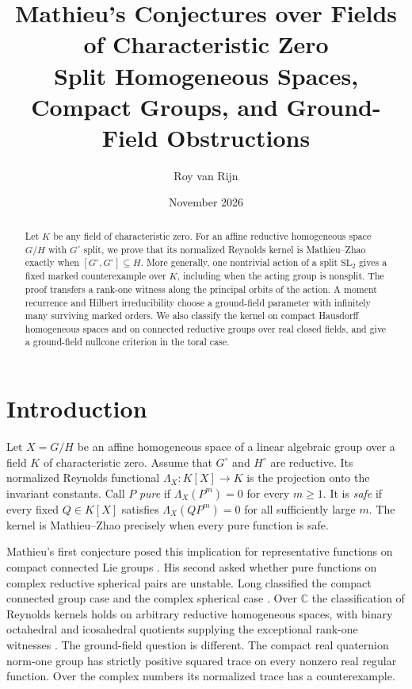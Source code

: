 \documentclass[11pt]{article}
\title{Mathieu's Conjectures over Fields of Characteristic Zero\\
\large Split Homogeneous Spaces, Compact Groups, and Ground-Field Obstructions}
\author{Roy van Rijn}
\date{November 2026}
\newcommand{\CC}{\mathbb C}
\newcommand{\SL}{\mathrm{SL}}
\begin{document}
\maketitle

\begin{abstract}
Let \(K\) be any field of characteristic zero. For an affine reductive
homogeneous space \(G/H\) with \(G^\circ\) split, we prove that its normalized
Reynolds kernel is Mathieu--Zhao exactly when \([G^\circ,G^\circ]\subseteq H\).
More generally, one nontrivial action of a split \(\SL_2\) gives a fixed
marked counterexample over \(K\), including when the acting group is
nonsplit. The proof transfers a rank-one witness along the principal
orbits of the action. A moment recurrence and Hilbert irreducibility
choose a ground-field parameter with infinitely many surviving marked
orders. We also classify the kernel on compact Hausdorff homogeneous
spaces and on connected reductive groups over real closed fields, and
give a ground-field nullcone criterion in the toral case.
\end{abstract}

\section{Introduction}

Let \(X=G/H\) be an affine homogeneous space of a linear algebraic group
over a field \(K\) of characteristic zero. Assume that \(G^\circ\) and
\(H^\circ\) are reductive. Its normalized Reynolds functional
\(\Lambda_X:K[X]\to K\) is the projection onto the invariant constants.
Call \(P\) \emph{pure} if \(\Lambda_X(P^m)=0\) for every \(m\ge1\).
It is \emph{safe} if every fixed \(Q\in K[X]\) satisfies
\(\Lambda_X(QP^m)=0\) for all sufficiently large \(m\).
The kernel is Mathieu--Zhao precisely when every pure function is safe.

Mathieu's first conjecture posed this implication for representative
functions on compact connected Lie groups \cite{Mathieu}. His second
asked whether pure functions on complex reductive spherical pairs are
unstable. Long classified the compact connected group case and the
complex spherical case \cite{Long,LongSpherical}. Over \(\CC\) the
classification of Reynolds kernels holds on arbitrary reductive
homogeneous spaces, with binary octahedral and icosahedral quotients
supplying the exceptional rank-one witnesses \cite{Complex}. The
ground-field question is different. The compact real quaternion
norm-one group has strictly positive squared trace on every nonzero
real regular function. Over the complex numbers its normalized trace
has a counterexample.
\end{document}
